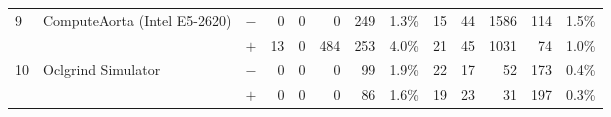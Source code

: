 \begin{tabular}{lll | rrrrr | rrrrr }
\hline
\multirow{ 2}{*}{9} & \multirow{ 2}{*}{ComputeAorta (Intel E5-2620)} & $-$ & 0 & 0 & 0 & 249 & 1.3\%       & 15 & 44 & 1586 & 114 & 1.5\% \\& & $+$ & 13 & 0 & 484 & 253 & 4.0\% & 21 & 45 & 1031 & 74 & 1.0\% \\
\hline
\multirow{ 2}{*}{10} & \multirow{ 2}{*}{Oclgrind Simulator} & $-$ & 0 & 0 & 0 & 99 & 1.9\%       & 22 & 17 & 52 & 173 & 0.4\% \\& & $+$ & 0 & 0 & 0 & 86 & 1.6\% & 19 & 23 & 31 & 197 & 0.3\% \\
  \bottomrule
\end{tabular}

